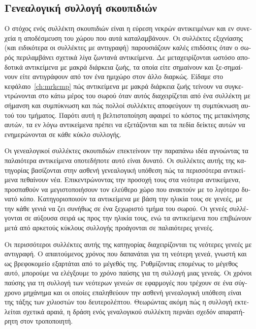 \begin{greek}
\chapter{Γενεαλογική συλλογή σκουπιδιών}\label{ch:gen}

Ο στόχος ενός συλλέκτη σκουπιδιών είναι η εύρεση νεκρών αντικειμένων
και εν συνεχεία η αποδέσμευση του χώρου που αυτά καταλαμβάνουν.
Οι συλλέκτες εξιχνίασης (και ειδικότερα οι συλλέκτες με αντιγραφή)
παρουσιάζουν καλές επιδόσεις όταν ο σωρός περιλαμβάνει σχετικά
λίγα ζωντανά αντικείμενα. Δε μεταχειρίζονται ωστόσο αποδοτικά
αντικείμενα με μακρά διάρκεια ζωής, τα οποία είτε σημαίνουν και
ξε-σημαίνουν είτε αντιγράφουν από τον ένα ημιχώρο στον άλλο
διαρκώς. Είδαμε στο κεφάλαιο~\ref{ch:mrkcmp} πώς αντικείμενα με
μακρά διάρκεια ζωής τείνουν να συγκεντρώνονται στο κάτω μέρος
του σωρού όταν αυτός διαχειρίζεται από ένα συλλέκτη με σήμανση
και συμπύκνωση και πώς πολλοί συλλέκτες αποφεύγουν τη συμπύκνωση
αυτού του τμήματος. Παρότι αυτή η βελτιστοποίηση αφαιρεί το κόστος
της μετακίνησης αυτών, τα εν λόγω αντικείμενα πρέπει να εξετάζονται
και τα πεδία δείκτες αυτών να ενημερώνονται σε κάθε κύκλο συλλογής. 

Οι γενεαλογικοί συλλέκτες σκουπιδιών επεκτείνουν την παραπάνω
ιδέα αγνοώντας τα παλαιότερα αντικείμενα οποτεδήποτε αυτό είναι
δυνατό. Οι συλλέκτες αυτής της κατηγορίας βασίζονται στην ασθενή
γενεαλογική υπόθεση πώς τα περισσότερα αντικείμενα πεθαίνουν νέα.
Επικεντρώνοντας την προσοχή τους στα νεότερα αντικείμενα, προσπαθούν
να μεγιστοποιήσουν τον ελεύθερο χώρο που ανακτούν με το λιγότερο
δυνατό κόπο. Κατηγοριοποιούν τα αντικείμενα με βάση την ηλικία
τους σε γενεές, με την κάθε γενιά να ζει συνήθως σε ένα ξεχωριστό
τμήμα του σωρού. Οι γενεές συλλέγονται σε αύξουσα σειρά ως προς
την ηλικία  τους, ενώ  τα αντικείμενα που επιβιώνουν μετά από
αρκετούς κύκλους συλλογής προάγονται σε παλαιότερες γενεές.

Οι περισσότεροι συλλέκτες αυτής της κατηγορίας διαχειρίζονται
τις νεότερες γενεές με αντιγραφή. Ο απαιτούμενος χρόνος που
δαπανάται για τη νεότερη γενεά, γνωστή και ως βρεφοκομείο εξαρτάται
από το μέγεθός της. Ρυθμίζοντας επομένως το μέγεθος αυτό, μπορούμε
να ελέγξουμε το χρόνο παύσης για τη συλλογή μιας γενεάς. Οι χρόνοι
παύσης για τη συλλογή των νεότερων γενεών σε εφαρμογές που τρέχουν
σε ένα σύγχρονο μηχάνημα και οι οποίες επαληθεύουν την ασθενή
γενεαλογική υπόθεση είναι της τάξης των χιλιοστών του δευτερολέπτου.
Θεωρώντας ακόμη πώς η συλλογή εκτελείται σχετικά αραιά, η δράση
ενός γεναλογικού συλλέκτη περνάει σχεδόν απαρατήρητη στον τροποποιητή.


\end{greek}
